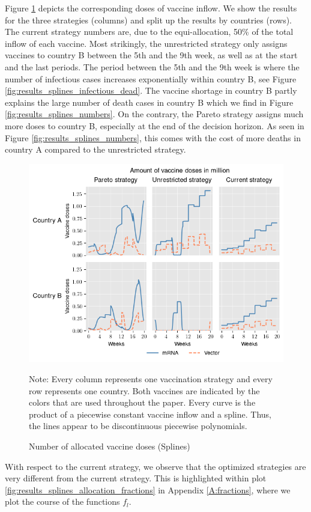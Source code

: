Figure \ref{fig:results_splines_allocation} depicts the corresponding doses of vaccine inflow. We show the results for the three strategies (columns) and split up the results by countries (rows). The current strategy numbers are, due to the equi-allocation, 50\% of the total inflow of each vaccine. Most strikingly, the unrestricted strategy only assigns vaccines to country B between the 5th and the 9th week, as well as at the start and the last periods. The period between the 5th and the 9th week is where the number of infectious cases increases exponentially within country B, see Figure \ref{fig:results_splines_infectious_dead}.
The vaccine shortage in country B partly explains the large number of death cases in country B which we find in Figure \ref{fig:results_splines_numbers}. On the contrary, the Pareto strategy assigns much more doses to country B, especially at the end of the decision horizon. As seen in Figure \ref{fig:results_splines_numbers}, this comes with the cost of more deaths in country A compared to the unrestricted strategy.
\begin{figure}[h!]
\centering
\includegraphics[scale=0.85]{images/splines_vaccine_total_quantity.png}
\begin{flushleft}
\scriptsize{Note:} Every column represents one vaccination strategy and every row represents one country. Both vaccines are indicated by the colors that are used throughout the paper. 
Every curve is the product of a piecewise constant vaccine inflow and a spline. Thus, the lines appear to be discontinuous piecewise polynomials. 
\end{flushleft}
\caption{Number of allocated vaccine doses (Splines)}
\label{fig:results_splines_allocation}
\end{figure}
With respect to the current strategy, we observe that the optimized strategies are very different from the current strategy. This is highlighted within plot \ref{fig:results_splines_allocation_fractions} in Appendix \ref{A:fractions}, where we plot the course of the functions $f_l$.\\
 
